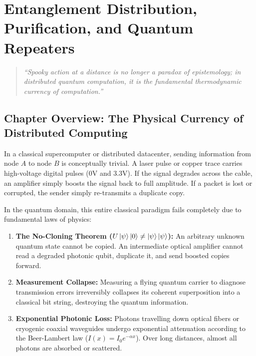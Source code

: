 \chapter{Entanglement Distribution, Purification, and Quantum Repeaters}
\label{ch:entanglement_physics}

\begin{quote}
\textit{``Spooky action at a distance is no longer a paradox of epistemology; in distributed quantum computation, it is the fundamental thermodynamic currency of computation.''}
\end{quote}

\section*{Chapter Overview: The Physical Currency of Distributed Computing}

In a classical supercomputer or distributed datacenter, sending information from node $A$ to node $B$ is conceptually trivial. A laser pulse or copper trace carries high-voltage digital pulses ($0\text{V}$ and $3.3\text{V}$). If the signal degrades across the cable, an amplifier simply boosts the signal back to full amplitude. If a packet is lost or corrupted, the sender simply re-transmits a duplicate copy.

In the quantum domain, this entire classical paradigm fails completely due to fundamental laws of physics:
\begin{enumerate}
    \item \textbf{The No-Cloning Theorem ($U\ket{\psi}\ket{0} \neq \ket{\psi}\ket{\psi}$):} An arbitrary unknown quantum state cannot be copied. An intermediate optical amplifier cannot read a degraded photonic qubit, duplicate it, and send boosted copies forward.
    \item \textbf{Measurement Collapse:} Measuring a flying quantum carrier to diagnose transmission errors irreversibly collapses its coherent superposition into a classical bit string, destroying the quantum information.
    \item \textbf{Exponential Photonic Loss:} Photons travelling down optical fibers or cryogenic coaxial waveguides undergo exponential attenuation according to the Beer-Lambert law ($I(x) = I_0 e^{-\alpha x}$). Over long distances, almost all photons are absorbed or scattered.
\end{enumerate}

